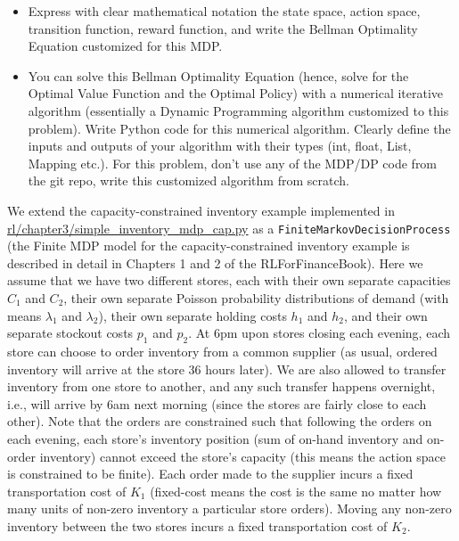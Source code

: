 \documentclass[12pt]{exam}
\begin{document}
\begin{questions}
\begin{itemize}
\item Express with clear mathematical notation the state space, action space, transition function, reward function, and write the Bellman Optimality Equation customized for this MDP.
\item You can solve this Bellman Optimality Equation (hence, solve for the Optimal Value Function and the Optimal Policy) with a numerical iterative algorithm (essentially a Dynamic Programming algorithm customized to this problem). Write Python code for this numerical algorithm. Clearly define the inputs and outputs of your algorithm with their types (int, float, List, Mapping etc.). For this problem, don't use any of the MDP/DP code from the git repo, write this customized algorithm from scratch.
\end{itemize}

 We extend the capacity-constrained inventory example implemented in \href{https://github.com/TikhonJelvis/RL-book/blob/master/rl/chapter3/simple_inventory_mdp_cap.py}{rl\//chapter3\//simple\_inventory\_mdp\_cap.py} as a \lstinline{FiniteMarkovDecisionProcess} (the Finite MDP model for the capacity-constrained inventory example is described in detail in Chapters 1 and 2 of the RLForFinanceBook). Here we assume that we have two different stores, each with their own separate capacities $C_1$ and $C_2$, their own separate Poisson probability distributions of demand (with means $\lambda_1$ and $\lambda_2$), their own separate holding costs $h_1$ and $h_2$, and their own separate stockout costs $p_1$ and $p_2$. At 6pm upon stores closing each evening, each store can choose to order inventory from a common supplier (as usual, ordered inventory will arrive at the store 36 hours later). We are also allowed to transfer inventory from one store to another, and any such transfer happens overnight, i.e., will arrive by 6am next morning (since the stores are fairly close to each other). Note that the orders are constrained such that following the orders on each evening, each store's inventory position (sum of on-hand inventory and on-order inventory) cannot exceed the store's capacity (this means the action space is constrained to be finite). Each order made to the supplier incurs a fixed transportation cost of $K_1$ (fixed-cost means the cost is the same no matter how many units of non-zero inventory a particular store orders). Moving any non-zero inventory between the two stores incurs a fixed transportation cost of $K_2$. 


\end{questions}
\end{document}
